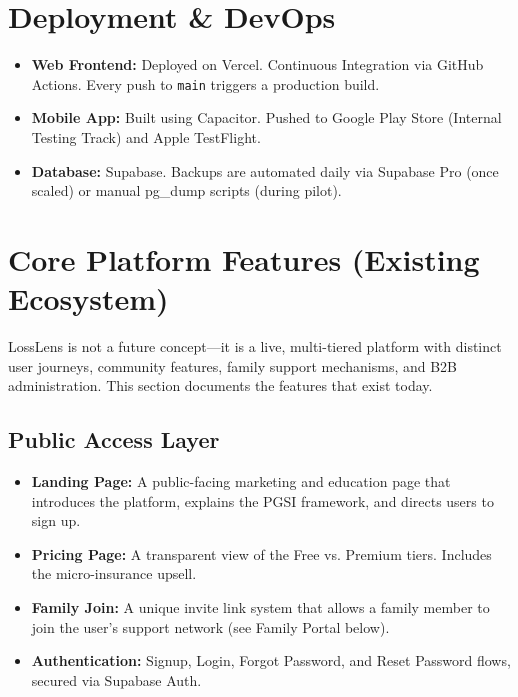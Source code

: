 \documentclass[11pt,a4paper]{article}
\begin{document}
\section{Deployment \& DevOps}
\begin{itemize}
    \item \textbf{Web Frontend:} Deployed on Vercel. Continuous Integration via GitHub Actions. Every push to \texttt{main} triggers a production build.
    \item \textbf{Mobile App:} Built using Capacitor. Pushed to Google Play Store (Internal Testing Track) and Apple TestFlight.
    \item \textbf{Database:} Supabase. Backups are automated daily via Supabase Pro (once scaled) or manual pg\_dump scripts (during pilot).
\end{itemize}


\section{Core Platform Features (Existing Ecosystem)}
LossLens is not a future concept—it is a live, multi-tiered platform with distinct user journeys, community features, family support mechanisms, and B2B administration. This section documents the features that exist today.

\subsection{Public Access Layer}
\begin{itemize}
    \item \textbf{Landing Page:} A public-facing marketing and education page that introduces the platform, explains the PGSI framework, and directs users to sign up.
    \item \textbf{Pricing Page:} A transparent view of the Free vs. Premium tiers. Includes the micro-insurance upsell.
    \item \textbf{Family Join:} A unique invite link system that allows a family member to join the user's support network (see Family Portal below).
    \item \textbf{Authentication:} Signup, Login, Forgot Password, and Reset Password flows, secured via Supabase Auth.
\end{itemize}
\end{document}

